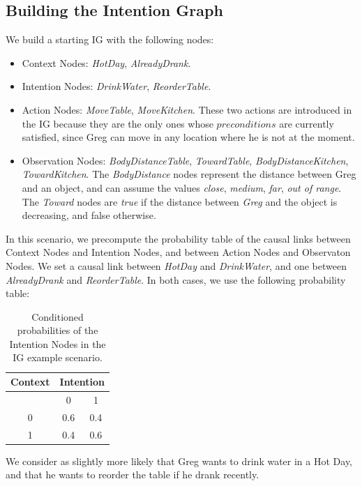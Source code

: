 \subsection{Building the Intention Graph}
We build a starting IG with the following nodes:
\begin{itemize}
	\item Context Nodes: \textit{HotDay}, \textit{AlreadyDrank}.
	\item Intention Nodes: \textit{DrinkWater}, \textit{ReorderTable}.
	\item Action Nodes: \textit{MoveTable}, \textit{MoveKitchen}. These two actions are introduced in the IG because they are the only ones whose $preconditions$ are currently satisfied, since Greg can move in any location where he is not at the moment.
	\item Observation Nodes: \textit{BodyDistanceTable}, \textit{TowardTable}, \textit{BodyDistanceKitchen}, \textit{TowardKitchen}. The \textit{BodyDistance} nodes represent the distance between Greg and an object, and can assume the values \textit{close}, \textit{medium}, \textit{far}, \textit{out of range}. The \textit{Toward} nodes are \textit{true} if the distance between \textit{Greg} and the object is decreasing, and false otherwise.
\end{itemize}


In this scenario, we precompute the probability table of the causal links between Context Nodes and Intention Nodes, and between Action Nodes and Observaton Nodes. We set a causal link between \textit{HotDay} and \textit{DrinkWater}, and one between \textit{AlreadyDrank} and \textit{ReorderTable}. In both cases, we use the following probability table:

 \begin{table}[h!]
\centering
\begin{tabular}{|c|c|c|}
\hline
Context & \multicolumn{2}{|c|}{Intention} \\ \hline \hline
& 0 & 1 \\ \hline
0  & 0.6 & 0.4 \\ \hline
1 & 0.4 & 0.6 \\ \hline
\end{tabular}
\caption[Belief models in the IG scenario]{Conditioned probabilities of the Intention Nodes in the IG example scenario.}
 \label{table:intention-ig_intention}    
\end{table}

We consider as slightly more likely that Greg wants to drink water in a Hot Day, and that he wants to reorder the table if he drank recently.

